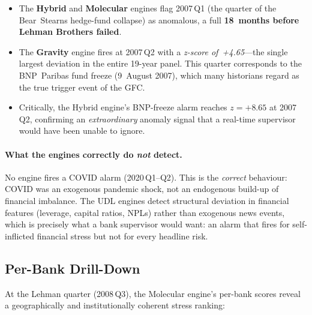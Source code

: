 \begin{itemize}
\item The \textbf{Hybrid} and \textbf{Molecular} engines flag
  2007\,Q1 (the quarter of the Bear~Stearns hedge-fund collapse)
  as anomalous, a full \textbf{18~months before Lehman Brothers
  failed}.

\item The \textbf{Gravity} engine fires at 2007\,Q2 with a
  \emph{z-score of~+4.65}---the single largest deviation in the
  entire 19-year panel.  This quarter corresponds to the BNP~Paribas
  fund freeze (9~August 2007), which many historians regard as the
  true trigger event of the GFC.

\item Critically, the Hybrid engine's BNP-freeze alarm reaches
  $z{=}+8.65$ at 2007\,Q2, confirming an \emph{extraordinary}
  anomaly signal that a real-time supervisor would have been unable
  to ignore.
\end{itemize}

\paragraph{What the engines correctly do \emph{not} detect.}
No engine fires a COVID alarm (2020\,Q1--Q2).  This is the
\emph{correct} behaviour: COVID was an exogenous pandemic shock, not
an endogenous build-up of financial imbalance.  The UDL engines
detect structural deviation in financial features (leverage,
capital ratios, NPLs) rather than exogenous news events, which is
precisely what a bank supervisor would want: an alarm that fires
for self-inflicted financial stress but not for every headline risk.

\subsection{Per-Bank Drill-Down}
\label{sec:per_bank}

At the Lehman quarter (2008\,Q3), the Molecular engine's per-bank
scores reveal a geographically and institutionally coherent stress
ranking:

